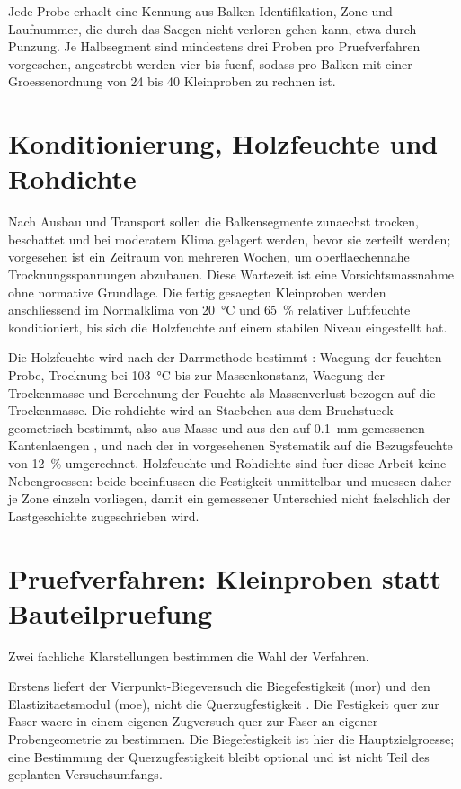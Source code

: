 Jede Probe erhaelt eine Kennung aus Balken-Identifikation, Zone und Laufnummer,
die durch das Saegen nicht verloren gehen kann, etwa durch Punzung. Je Halbsegment
sind mindestens drei Proben pro Pruefverfahren vorgesehen, angestrebt werden
vier bis fuenf, sodass pro Balken mit einer Groessenordnung von 24 bis 40
Kleinproben zu rechnen ist.

\section{Konditionierung, Holzfeuchte und Rohdichte}
\label{sec:konditionierung}

Nach Ausbau und Transport sollen die Balkensegmente zunaechst trocken,
beschattet und bei moderatem Klima gelagert werden, bevor sie zerteilt werden;
vorgesehen ist ein Zeitraum von mehreren Wochen, um oberflaechennahe
Trocknungsspannungen abzubauen. Diese Wartezeit ist eine Vorsichtsmassnahme
ohne normative Grundlage. Die fertig gesaegten Kleinproben werden anschliessend
im Normalklima von \SI{20}{\celsius} und \SI{65}{\percent} relativer
Luftfeuchte konditioniert, bis sich die Holzfeuchte auf einem stabilen Niveau
eingestellt hat.

Die Holzfeuchte wird nach der Darrmethode bestimmt
\parencite{din13183}: Waegung der feuchten Probe, Trocknung bei
\SI{103}{\celsius} bis zur Massenkonstanz, Waegung der Trockenmasse und
Berechnung der Feuchte als Massenverlust bezogen auf die Trockenmasse. Die
\gls{rohdichte} wird an Staebchen aus dem Bruchstueck geometrisch bestimmt,
also aus Masse und aus den auf \SI{0.1}{\milli\metre} gemessenen Kantenlaengen
\parencite{iso13061}, und nach der in \textcite{en384} vorgesehenen Systematik
auf die Bezugsfeuchte von \SI{12}{\percent} umgerechnet. Holzfeuchte und
Rohdichte sind fuer diese Arbeit keine Nebengroessen: beide beeinflussen die
Festigkeit unmittelbar und muessen daher je Zone einzeln vorliegen, damit ein
gemessener Unterschied nicht faelschlich der Lastgeschichte zugeschrieben wird.

\section{Pruefverfahren: Kleinproben statt Bauteilpruefung}
\label{sec:pruefverfahren}

Zwei fachliche Klarstellungen bestimmen die Wahl der Verfahren.

Erstens liefert der Vierpunkt-Biegeversuch die Biegefestigkeit
(\acrshort{mor}) und den Elastizitaetsmodul (\acrshort{moe}), nicht die
Querzugfestigkeit \parencite{en408,fourpoint}. Die Festigkeit quer zur Faser
waere in einem eigenen Zugversuch quer zur Faser an eigener Probengeometrie zu
bestimmen. Die Biegefestigkeit ist hier die Hauptzielgroesse; eine Bestimmung
der Querzugfestigkeit bleibt optional und ist nicht Teil des geplanten
Versuchsumfangs.


